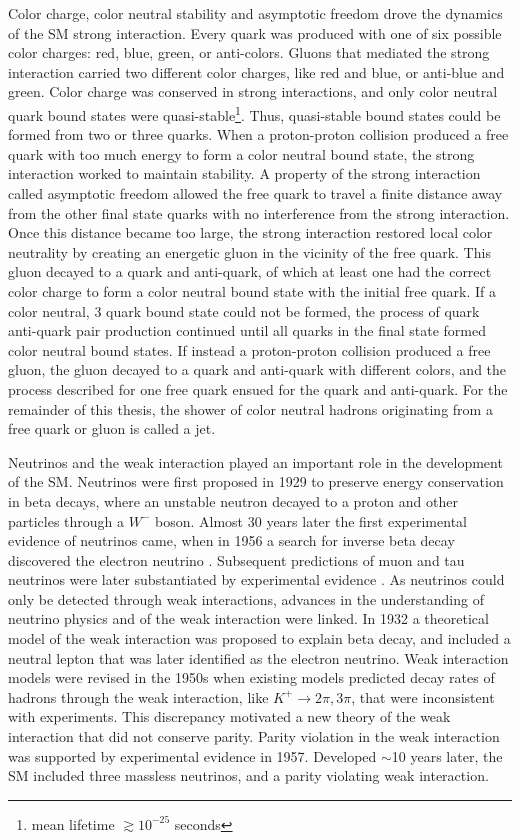 Color charge, color neutral stability and asymptotic freedom drove the dynamics of the SM strong interaction.  
Every quark was produced with one of six possible color charges: red, blue, green, or anti-colors.  Gluons 
that mediated the strong interaction carried two different color charges, like red and blue, or anti-blue and 
green.  Color charge was conserved in strong interactions, and only color neutral quark bound states were 
quasi-stable\footnote{mean lifetime $\gtrsim 10^{-25}$ seconds}.  Thus, quasi-stable bound states could be formed 
from two or three quarks.  
When a proton-proton collision produced a free quark with too much energy to form a color neutral bound state, 
the strong interaction worked to maintain stability.  A property of the strong interaction called 
asymptotic freedom allowed the free quark to travel a finite distance away from the other final state quarks 
with no interference from the strong interaction.  Once this distance became too large, the 
strong interaction restored local color neutrality by creating an energetic gluon in the vicinity of the free quark.  This 
gluon decayed to a quark and anti-quark, of which at least one had the correct color charge to 
form a color neutral bound state with the initial free quark.  If a color neutral, 3 quark bound state could not 
be formed, the process of quark anti-quark 
pair production continued until all quarks in the final state formed color neutral bound states.  If 
instead a proton-proton collision produced a free gluon, the gluon decayed to a quark and anti-quark with 
different colors, and the process described for one free quark ensued for the quark and anti-quark.  For 
the remainder of this thesis, the shower of color neutral hadrons originating from a free quark or gluon is 
called a jet.

Neutrinos and the weak interaction played an important role in the development of the SM.  
Neutrinos were first proposed in 1929 to preserve energy conservation in beta decays, where an unstable 
neutron decayed to a proton and other particles through a $W^{-}$ boson.  Almost 30 years later the first 
experimental evidence of neutrinos came, when in 1956 a search for inverse beta decay discovered the electron 
neutrino \cite{firstNuDiscovery}.  Subsequent predictions of muon and tau neutrinos were later substantiated 
by experimental evidence \cite{muNuDiscovery,tauNuDiscovery}.  As neutrinos could only be detected through weak 
interactions, advances in the understanding of neutrino physics and of the weak interaction were linked.  
In 1932 a theoretical model of the weak interaction was proposed to 
explain beta decay, and included a neutral lepton that was later identified as the electron neutrino.  Weak 
interaction models were revised in the 1950s when existing models predicted decay rates of hadrons through the 
weak interaction, like $K^{+} \rightarrow 2\pi, 3\pi$, that were inconsistent with experiments.  This discrepancy 
motivated a new theory of the weak interaction that did not conserve parity.  Parity violation in the weak 
interaction was supported by experimental evidence \cite{weakParityViolation} in 1957.  Developed $\sim$10 years 
later, the SM included three massless neutrinos, and a parity violating weak interaction.

